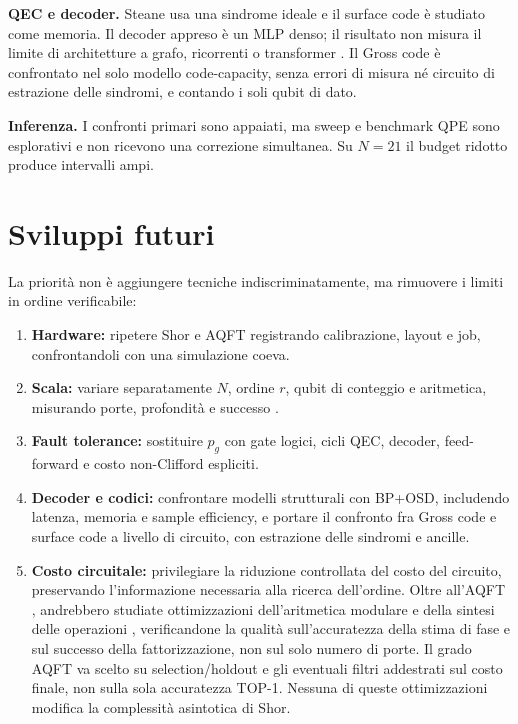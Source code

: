 \label{sec:finale_6_3_3}
\textbf{QEC e decoder.} Steane usa una sindrome ideale e il surface code è studiato come memoria. Il decoder appreso è un MLP denso; il risultato non misura il limite di architetture a grafo, ricorrenti o transformer \cite{alphaqubit2024,torlaiMelko2017,yan2026}. Il Gross code è confrontato nel solo modello code-capacity, senza errori di misura né circuito di estrazione delle sindromi, e contando i soli qubit di dato.

\label{sec:finale_6_3_4}
\textbf{Inferenza.} I confronti primari sono appaiati, ma sweep e benchmark QPE sono esplorativi e non ricevono una correzione simultanea. Su $N=21$ il budget ridotto produce intervalli ampi.

\section{Sviluppi futuri}\label{sec:finale_6_4}

La priorità non è aggiungere tecniche indiscriminatamente, ma rimuovere i limiti in ordine verificabile:

\begin{enumerate}
\setlength{\itemsep}{0pt}
\setlength{\parsep}{0pt}
\item {}\label{sec:finale_6_4_1}\textbf{Hardware:} ripetere Shor e AQFT registrando calibrazione, layout e job, confrontandoli con una simulazione coeva.
\item {}\label{sec:finale_6_4_2}\textbf{Scala:} variare separatamente $N$, ordine $r$, qubit di conteggio e aritmetica, misurando porte, profondità e successo \cite{chevignard2025,gidney2021,shuklaqpe2026}.
\item {}\label{sec:finale_6_4_3}\textbf{Fault tolerance:} sostituire $p_g$ con gate logici, cicli QEC, decoder, feed-forward e costo non-Clifford espliciti.
\item {}\label{sec:finale_6_4_4}\textbf{Decoder e codici:} confrontare modelli strutturali con BP+OSD, includendo latenza, memoria e sample efficiency, e portare il confronto fra Gross code e surface code a livello di circuito, con estrazione delle sindromi e ancille.
\item {}\label{sec:finale_6_4_5}\textbf{Costo circuitale:} privilegiare la riduzione controllata del costo del circuito, preservando l'informazione necessaria alla ricerca dell'ordine. Oltre all'AQFT \cite{barencoAQFT1996}, andrebbero studiate ottimizzazioni dell'aritmetica modulare e della sintesi delle operazioni \cite{gidney2021}, verificandone la qualità sull'accuratezza della stima di fase e sul successo della fattorizzazione, non sul solo numero di porte. Il grado AQFT va scelto su selection/holdout e gli eventuali filtri addestrati sul costo finale, non sulla sola accuratezza TOP-1. Nessuna di queste ottimizzazioni modifica la complessità asintotica di Shor.
\end{enumerate}

